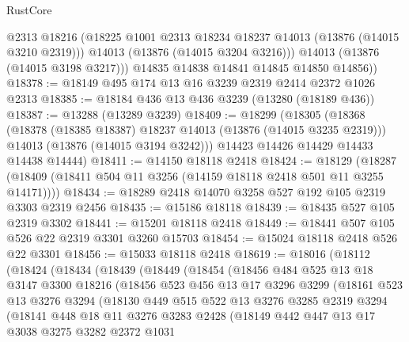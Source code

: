 \begin{lexlean}{RustCore}
\begin{coremodule}
            @2313
            @18216
            (@18225 @1001 @2313 @18234 @18237 @14013 (@13876 (@14015 @3210 @2319)))
            @14013
            (@13876 (@14015 @3204 @3216)))
          @14013
          (@13876 (@14015 @3198 @3217)))
        @14835
        @14838
        @14841
        @14845
        @14850
        @14856))
@18378 := @18149 @495 @174 @13 @16 @3239 @2319 @2414 @2372 @1026 @2313
@18385 := @18184 @436 @13 @436 @3239 (@13280 (@18189 @436))
@18387 := @13288 (@13289 @3239)
@18409 := @18299
    (@18305
      (@18368
        (@18378 (@18385 @18387) @18237 @14013 (@13876 (@14015 @3235 @2319)))
        @14013
        (@13876 (@14015 @3194 @3242)))
      @14423
      @14426
      @14429
      @14433
      @14438
      @14444)
@18411 := @14150 @18118 @2418
@18424 := @18129
    (@18287 (@18409 (@18411 @504 @11 @3256 (@14159 @18118 @2418 @501 @11 @3255 @14171))))
@18434 := @18289 @2418 @14070 @3258 @527 @192 @105 @2319 @3303 @2319 @2456
@18435 := @15186 @18118
@18439 := @18435 @527 @105 @2319 @3302
@18441 := @15201 @18118 @2418
@18449 := @18441 @507 @105 @526 @22 @2319 @3301 @3260 @15703
@18454 := @15024 @18118 @2418 @526 @22 @3301
@18456 := @15033 @18118 @2418
@18619 := @18016
    (@18112
      (@18424
        (@18434
          (@18439
            (@18449
              (@18454
                (@18456
                  @484
                  @525
                  @13
                  @18
                  @3147
                  @3300
                  @18216
                  (@18456
                    @523
                    @456
                    @13
                    @17
                    @3296
                    @3299
                    (@18161
                      @523
                      @13
                      @3276
                      @3294
                      (@18130
                        @449
                        @515
                        @522
                        @13
                        @3276
                        @3285
                        @2319
                        @3294
                        (@18141
                          @448
                          @18
                          @11
                          @3276
                          @3283
                          @2428
                          (@18149
                            @442
                            @447
                            @13
                            @17
                            @3038
                            @3275
                            @3282
                            @2372
                            @1031

\end{coremodule}
\end{lexlean}
